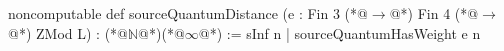 noncomputable def sourceQuantumDistance (e : Fin 3 (*@$\to$@*) Fin 4 (*@$\to$@*) ZMod L) : (*@$\mathbb N$@*)(*@$\infty$@*) :=
  sInf {n | sourceQuantumHasWeight e n}
